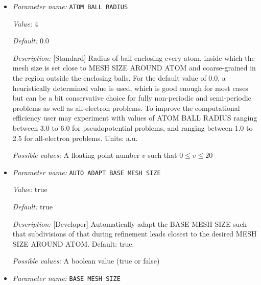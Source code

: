 \begin{itemize}
\item {\it Parameter name:} {\tt ATOM BALL RADIUS}
\label{parameters:Finite element mesh parameters/Auto mesh generation parameters/ATOM BALL RADIUS}
\label{parameters:Finite_20element_20mesh_20parameters/Auto_20mesh_20generation_20parameters/ATOM_20BALL_20RADIUS}


{\it Value:} 4


{\it Default:} 0.0


{\it Description:} [Standard] Radius of ball enclosing every atom, inside which the mesh size is set close to MESH SIZE AROUND ATOM and coarse-grained in the region outside the enclosing balls. For the default value of 0.0, a heuristically determined value is used, which is good enough for most cases but can be a bit conservative choice for fully non-periodic and semi-periodic problems as well as all-electron problems. To improve the computational efficiency user may experiment with values of ATOM BALL RADIUS ranging between 3.0 to 6.0 for pseudopotential problems, and ranging between 1.0 to 2.5 for all-electron problems.  Units: a.u.


{\it Possible values:} A floating point number $v$ such that $0 \leq v \leq 20$
\item {\it Parameter name:} {\tt AUTO ADAPT BASE MESH SIZE}
\label{parameters:Finite element mesh parameters/Auto mesh generation parameters/AUTO ADAPT BASE MESH SIZE}
\label{parameters:Finite_20element_20mesh_20parameters/Auto_20mesh_20generation_20parameters/AUTO_20ADAPT_20BASE_20MESH_20SIZE}


{\it Value:} true


{\it Default:} true


{\it Description:} [Developer] Automatically adapt the BASE MESH SIZE such that subdivisions of that during refinement leads closest to the desired MESH SIZE AROUND ATOM. Default: true.


{\it Possible values:} A boolean value (true or false)
\item {\it Parameter name:} {\tt BASE MESH SIZE}
\label{parameters:Finite element mesh parameters/Auto mesh generation parameters/BASE MESH SIZE}
\label{parameters:Finite_20element_20mesh_20parameters/Auto_20mesh_20generation_20parameters/BASE_20MESH_20SIZE}



\end{itemize}
